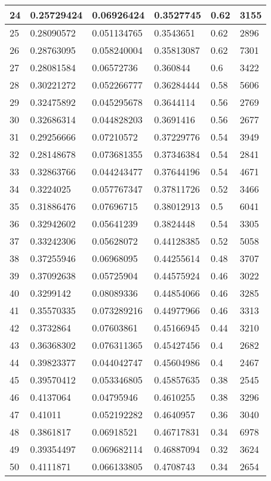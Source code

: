 \begin{longtable}{|l|l|l|l|l|l|}
24 & 0.25729424 & 0.06926424 & 0.3527745 & 0.62 & 3155 \\ \hline 
25 & 0.28090572 & 0.051134765 & 0.3543651 & 0.62 & 2896 \\ \hline 
26 & 0.28763095 & 0.058240004 & 0.35813087 & 0.62 & 7301 \\ \hline 
27 & 0.28081584 & 0.06572736 & 0.360844 & 0.6 & 3422 \\ \hline 
28 & 0.30221272 & 0.052266777 & 0.36284444 & 0.58 & 5606 \\ \hline 
29 & 0.32475892 & 0.045295678 & 0.3644114 & 0.56 & 2769 \\ \hline 
30 & 0.32686314 & 0.044828203 & 0.3691416 & 0.56 & 2677 \\ \hline 
31 & 0.29256666 & 0.07210572 & 0.37229776 & 0.54 & 3949 \\ \hline 
32 & 0.28148678 & 0.073681355 & 0.37346384 & 0.54 & 2841 \\ \hline 
33 & 0.32863766 & 0.044243477 & 0.37644196 & 0.54 & 4671 \\ \hline 
34 & 0.3224025 & 0.057767347 & 0.37811726 & 0.52 & 3466 \\ \hline 
35 & 0.31886476 & 0.07696715 & 0.38012913 & 0.5 & 6041 \\ \hline 
36 & 0.32942602 & 0.05641239 & 0.3824448 & 0.54 & 3305 \\ \hline 
37 & 0.33242306 & 0.05628072 & 0.44128385 & 0.52 & 5058 \\ \hline 
38 & 0.37255946 & 0.06968095 & 0.44255614 & 0.48 & 3707 \\ \hline 
39 & 0.37092638 & 0.05725904 & 0.44575924 & 0.46 & 3022 \\ \hline 
40 & 0.3299142 & 0.08089336 & 0.44854066 & 0.46 & 3285 \\ \hline 
41 & 0.35570335 & 0.073289216 & 0.44977966 & 0.46 & 3313 \\ \hline 
42 & 0.3732864 & 0.07603861 & 0.45166945 & 0.44 & 3210 \\ \hline 
43 & 0.36368302 & 0.076311365 & 0.45427456 & 0.4 & 2682 \\ \hline 
44 & 0.39823377 & 0.044042747 & 0.45604986 & 0.4 & 2467 \\ \hline 
45 & 0.39570412 & 0.053346805 & 0.45857635 & 0.38 & 2545 \\ \hline 
46 & 0.4137064 & 0.04795946 & 0.4610255 & 0.38 & 3296 \\ \hline 
47 & 0.41011 & 0.052192282 & 0.4640957 & 0.36 & 3040 \\ \hline 
48 & 0.3861817 & 0.06918521 & 0.46717831 & 0.34 & 6978 \\ \hline 
49 & 0.39354497 & 0.069682114 & 0.46887094 & 0.32 & 3624 \\ \hline 
50 & 0.4111871 & 0.066133805 & 0.4708743 & 0.34 & 2654 \\ \hline 
\end{longtable}